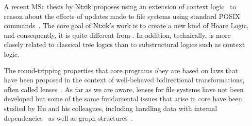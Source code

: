 A recent MSc thesis by Ntzik proposes using an extension of context
logic~\cite{context-logic} to reason about the effects of updates made
to file systems using standard POSIX commands~\cite{ntzik-msc}.  The
core goal of Ntzik's work is to create a new kind of Hoare Logic, and
consequently, it is quite different from \forest{}.  In addition,
technically, \forest{} is more closely related to classical tree
logics than to substructural logics such as context logic.

The round-tripping properties that core \forest{} programs obey are
based on laws that have been proposed in the context of well-behaved
bidirectional transformations, often called lenses~\cite{lenses}. As
far as we are aware, lenses for file systems have not been developed
but some of the same fundamental issues that arise in core \forest{}
have been studied by Hu and his colleagues, including handling data
with internal dependencies~\cite{MuAlgebraic2004} as well as graph
structures~\cite{hidaka-graphs}.
